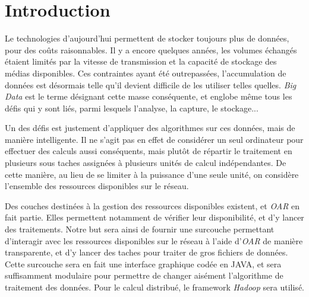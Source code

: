 \section{Introduction}

\par Le technologies d'aujourd'hui permettent de stocker toujours plus de données, pour des coûts raisonnables. Il y a encore quelques années, les volumes échangés étaient limités par la vitesse de transmission et la capacité de stockage des médias disponibles. Ces contraintes ayant été outrepassées, l'accumulation de données est désormais telle qu'il devient difficile de les utiliser telles quelles. \emph{Big Data} est le terme désignant cette masse conséquente, et englobe même tous les défis qui y sont liés, parmi lesquels l'analyse, la capture, le stockage...
\par Un des défis est justement d'appliquer des algorithmes sur ces données, mais de manière intelligente. Il ne s'agit pas en effet de considérer un seul ordinateur pour effectuer des calculs aussi conséquents, mais plutôt de répartir le traitement en plusieurs sous taches assignées à plusieurs unités de calcul indépendantes. De cette manière, au lieu de se limiter à la puissance d'une seule unité, on considère l'ensemble des ressources disponibles sur le réseau.
\par Des couches destinées à la gestion des ressources disponibles existent, et \emph{OAR} en fait partie. Elles permettent notamment de vérifier leur disponibilité, et d'y lancer des traitements. Notre but sera ainsi de fournir une surcouche permettant d'interagir avec les ressources disponibles sur le réseau à l'aide d'\emph{OAR} de manière transparente, et d'y lancer des taches pour traiter de gros fichiers de données. Cette surcouche sera en fait une interface graphique codée en JAVA, et sera suffisamment modulaire pour permettre de changer aisément l'algorithme de traitement des données. Pour le calcul distribué, le framework \emph{Hadoop} sera utilisé.

